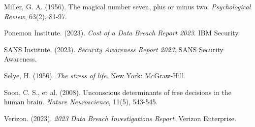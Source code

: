 \documentclass[11pt,a4paper]{article}
\begin{document}
\begin{thebibliography}{99}
Miller, G. A. (1956). The magical number seven, plus or minus two. \textit{Psychological Review}, 63(2), 81-97.

Ponemon Institute. (2023). \textit{Cost of a Data Breach Report 2023}. IBM Security.

SANS Institute. (2023). \textit{Security Awareness Report 2023}. SANS Security Awareness.

Selye, H. (1956). \textit{The stress of life}. New York: McGraw-Hill.

Soon, C. S., et al. (2008). Unconscious determinants of free decisions in the human brain. \textit{Nature Neuroscience}, 11(5), 543-545.

Verizon. (2023). \textit{2023 Data Breach Investigations Report}. Verizon Enterprise.

\end{thebibliography}
\end{document}
